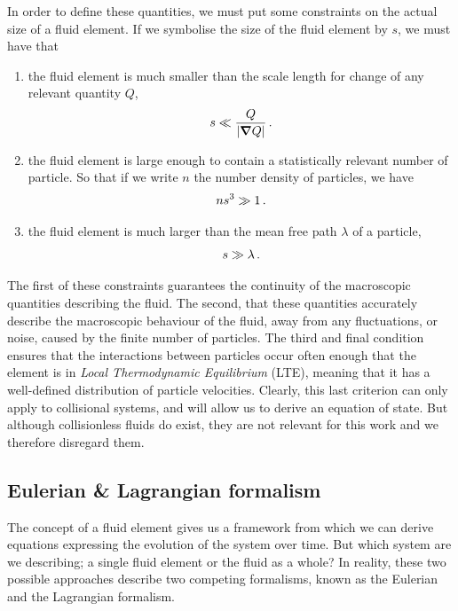In order to define these quantities, we must put some constraints on the actual size of a fluid element. If we symbolise the size of the fluid element by \(s\), we must have that

\begin{enumerate}
    \item the fluid element is much smaller than the scale length for change of any relevant quantity \(Q\),
    \begin{equation}
        s \ll \frac{Q}{|\boldsymbol{\nabla} Q|} \,\mathrm{.}
    \end{equation}

    \item the fluid element is large enough to contain a statistically relevant number of particle. So that if we write \(n\) the number density of particles, we have
    \begin{equation}
        n s^3 \gg 1 \,\mathrm{.}
    \end{equation}

    \item the fluid element is much larger than the mean free path \(\lambda\) of a particle,
    \begin{equation}
        s \gg \lambda \,\mathrm{.}
    \end{equation}
\end{enumerate}

The first of these constraints guarantees the continuity of the macroscopic quantities describing the fluid. The second, that these quantities accurately describe the macroscopic behaviour of the fluid, away from any fluctuations, or noise, caused by the finite number of particles. The third and final condition ensures that the interactions between particles occur often enough that the element is in \emph{Local Thermodynamic Equilibrium} (LTE), meaning that it has a well-defined distribution of particle velocities. Clearly, this last criterion can only apply to collisional systems, and will allow us to derive an equation of state. But although collisionless fluids do exist, they are not relevant for this work and we therefore disregard them.

\subsection{Eulerian \& Lagrangian formalism} \label{sec:fluid_form}

The concept of a fluid element gives us a framework from which we can derive equations expressing the evolution of the system over time. But which system are we describing; a single fluid element or the fluid as a whole? In reality, these two possible approaches describe two competing formalisms, known as the Eulerian and the Lagrangian formalism.

